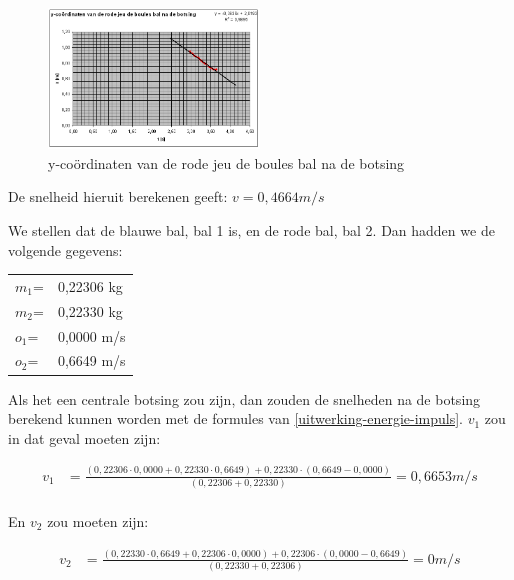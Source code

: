 \documentclass[12pt,a4paper]{article}
\begin{document}
	\begin{figure}[H]
		\centerline{\includegraphics[width=0.5\textwidth]{Plaatjes/007710.png}}
		\caption{y-co\"{o}rdinaten van de rode jeu de boules bal na de botsing}
		\label{007710}
	\end{figure}

	De snelheid hieruit berekenen geeft: $v=0,4664m/s$

	We stellen dat de blauwe bal, bal 1 is, en de rode bal, bal 2.
	Dan hadden we de volgende gegevens:

	\begin{tabular}{  l l }
		$m_1$= &0,22306 kg\\
		$m_2$= &0,22330 kg\\
		$o_1$= &0,0000 m/s\\
		$o_2$= &0,6649 m/s\\
	\end{tabular}

	Als het een centrale botsing zou zijn, dan zouden de snelheden na de botsing berekend kunnen worden met de formules van \eqref{uitwerking-energie-impuls}.
	$v_1$ zou in dat geval moeten zijn:

	\begin{equation}
		\begin{aligned}
			v_1&=\frac{\left(0,22306 \cdot 0,0000+0,22330 \cdot 0,6649\right)+0,22330 \cdot \left(0,6649-0,0000\right)}{\left(0,22306+0,22330\right)}=0,6653m/s\\
		\end{aligned}
	\end{equation}

	En $v_2$ zou moeten zijn:

	\begin{equation}
		\begin{aligned}
			v_2&=\frac{\left(0,22330 \cdot 0,6649+0,22306 \cdot 0,0000\right)+0,22306 \cdot \left(0,0000-0,6649\right)}{\left(0,22330+0,22306\right)}=0m/s
		\end{aligned}
	\end{equation}
\end{document}
